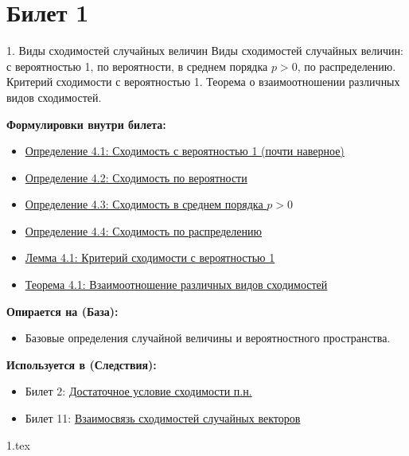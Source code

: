 \documentclass[a4paper, 12pt]{article}
\newcommand{\ticketsection}[1]{\vspace{0.5em}\noindent\textbf{\textcolor{ticketdark}{\sffamily #1}}\par}
\begin{document}
\section{Билет 1}
\begin{ticketskeleton}{1. Виды сходимостей случайных величин}
     Виды сходимостей случайных величин: с вероятностью 1, по вероятности, в среднем порядка $p > 0$, по распределению. Критерий сходимости с вероятностью 1. Теорема о взаимоотношении различных видов сходимостей.

    \ticketsection{Формулировки внутри билета:}
    \begin{itemize}
        \item \hyperref[def:conv_as]{Определение 4.1: Сходимость с вероятностью 1 (почти наверное)}
        \item \hyperref[def:conv_prob]{Определение 4.2: Сходимость по вероятности}
        \item \hyperref[def:conv_lp]{Определение 4.3: Сходимость в среднем порядка $p>0$}
        \item \hyperref[def:conv_dist]{Определение 4.4: Сходимость по распределению}
        \item \hyperref[lem:crit_as]{Лемма 4.1: Критерий сходимости с вероятностью 1}
        \item \hyperref[thm:conv_rel]{Теорема 4.1: Взаимоотношение различных видов сходимостей}
    \end{itemize}

    \ticketsection{Опирается на (База):}
    \begin{itemize}
        \item Базовые определения случайной величины и вероятностного пространства.
    \end{itemize}

    \ticketsection{Используется в (Следствия):}
    \begin{itemize}
        \item Билет 2: \hyperref[cor:suff_as]{Достаточное условие сходимости п.н.}
        \item Билет 11: \hyperref[prop:vector_comp]{Взаимосвязь сходимостей случайных векторов}
    \end{itemize}
\end{ticketskeleton}

{1.tex}
\end{document}
